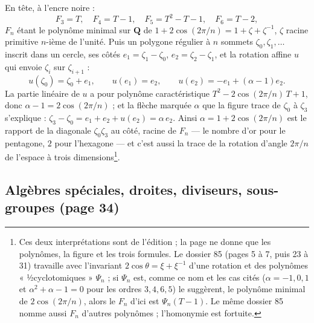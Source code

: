 \documentclass[11pt,a4paper]{article}
\begin{document}
En tête, à l'encre noire :
\[
  F_3 = T , \quad F_4 = T - 1 , \quad F_5 = T^2 - T - 1 , \quad F_6 = T - 2 ,
\]
$F_n$ étant le polynôme minimal sur $\mathbf{Q}$ de $1 + 2\cos(2\pi/n) = 1 + \zeta +
\zeta^{-1}$, $\zeta$ racine primitive $n$-ième de l'unité. Puis un polygone régulier
à $n$ sommets $\zeta_0, \zeta_1, \ldots$ inscrit dans un cercle, ses côtés
$e_1 = \zeta_1 - \zeta_0$, $e_2 = \zeta_2 - \zeta_1$, et la rotation affine $u$ qui
envoie $\zeta_i$ sur $\zeta_{i+1}$ :
\[
  u(\zeta_0) = \zeta_0 + e_1 , \qquad u(e_1) = e_2 , \qquad u(e_2) = -e_1 + (\alpha - 1)e_2 .
\]
La partie linéaire de $u$ a pour polynôme caractéristique $T^2 - 2\cos(2\pi/n)\,T +
1$, donc $\alpha - 1 = 2\cos(2\pi/n)$ ; et la flèche marquée $\alpha$ que la figure
trace de $\zeta_0$ à $\zeta_3$ s'explique : $\zeta_3 - \zeta_0 = e_1 + e_2 + u(e_2) =
\alpha\, e_2$. Ainsi $\alpha = 1 + 2\cos(2\pi/n)$ est le rapport de la diagonale
$\zeta_0\zeta_3$ au côté, racine de $F_n$ — le nombre d'or pour le pentagone, $2$
pour l'hexagone — et c'est aussi la trace de la rotation d'angle $2\pi/n$ de
l'espace à trois dimensions\footnote{Ces deux interprétations sont de l'édition ;
la page ne donne que les polynômes, la figure et les trois formules. Le
dossier 85 (pages 5 à 7, puis 23 à 31) travaille avec l'invariant
$2\cos\theta = \xi + \xi^{-1}$ d'une rotation et des polynômes
« ½cyclotomiques » $\Psi_n$ ; si $\Psi_n$ est, comme ce nom et les cas cités
($\alpha = -1, 0, 1$ et $\alpha^2 + \alpha - 1 = 0$ pour les ordres $3, 4, 6, 5$) le
suggèrent, le polynôme minimal de $2\cos(2\pi/n)$, alors le $F_n$ d'ici est
$\Psi_n(T - 1)$. Le même dossier 85 nomme aussi $F_n$ d'autres polynômes ;
l'homonymie est fortuite.}.

\subsection*{Algèbres spéciales, droites, diviseurs, sous-groupes (page 34)}
\end{document}
